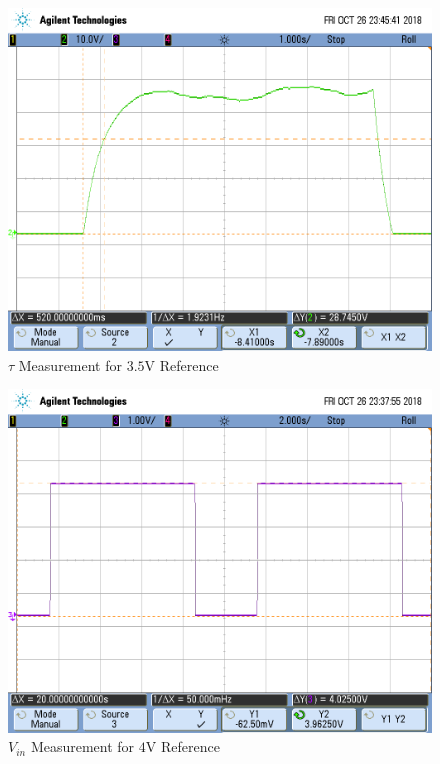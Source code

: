 \FloatBarrier

\FloatBarrier

\begin{figure}[h!]
	\centering
	\includegraphics[scale=0.75]{../images/scope_12.png}
	\caption{$\tau$ Measurement for $3.5$\si{\volt} Reference}
	\label{fig:scope_12}
\end{figure}

\FloatBarrier

\FloatBarrier

\begin{figure}[h!]
	\centering
	\includegraphics[scale=0.75]{../images/scope_6.png}
	\caption{$V_{in}$ Measurement for $4$\si{\volt} Reference}
	\label{fig:scope_6}
\end{figure}

